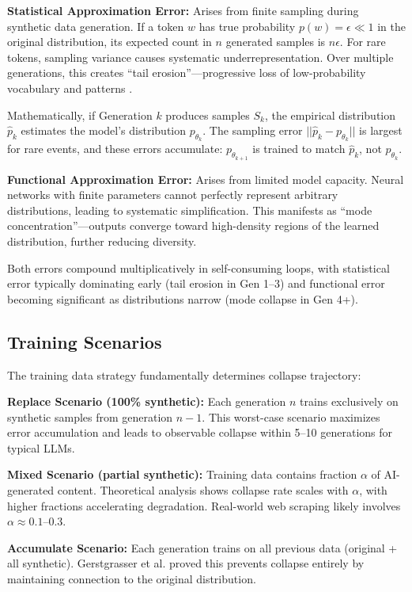 \documentclass[conference]{IEEEtran}
\begin{document}
\textbf{Statistical Approximation Error:} Arises from finite sampling during synthetic data generation. If a token $w$ has true probability $p(w) = \epsilon \ll 1$ in the original distribution, its expected count in $n$ generated samples is $n\epsilon$. For rare tokens, sampling variance causes systematic underrepresentation. Over multiple generations, this creates ``tail erosion''---progressive loss of low-probability vocabulary and patterns \cite{dohmatob2025strong, shumailov2024nature}.

Mathematically, if Generation $k$ produces samples $S_k$, the empirical distribution $\hat{p}_k$ estimates the model's distribution $p_{\theta_k}$. The sampling error $||\hat{p}_k - p_{\theta_k}||$ is largest for rare events, and these errors accumulate: $p_{\theta_{k+1}}$ is trained to match $\hat{p}_k$, not $p_{\theta_k}$.

\textbf{Functional Approximation Error:} Arises from limited model capacity. Neural networks with finite parameters cannot perfectly represent arbitrary distributions, leading to systematic simplification. This manifests as ``mode concentration''---outputs converge toward high-density regions of the learned distribution, further reducing diversity.

Both errors compound multiplicatively in self-consuming loops, with statistical error typically dominating early (tail erosion in Gen 1--3) and functional error becoming significant as distributions narrow (mode collapse in Gen 4+).

\subsection{Training Scenarios}

The training data strategy fundamentally determines collapse trajectory:

\textbf{Replace Scenario (100\% synthetic):} Each generation $n$ trains exclusively on synthetic samples from generation $n-1$. This worst-case scenario maximizes error accumulation and leads to observable collapse within 5--10 generations for typical LLMs.

\textbf{Mixed Scenario (partial synthetic):} Training data contains fraction $\alpha$ of AI-generated content. Theoretical analysis \cite{dohmatob2025strong} shows collapse rate scales with $\alpha$, with higher fractions accelerating degradation. Real-world web scraping likely involves $\alpha \approx 0.1$--$0.3$.

\textbf{Accumulate Scenario:} Each generation trains on all previous data (original + all synthetic). Gerstgrasser et al. \cite{gerstgrasser2024inevitable} proved this prevents collapse entirely by maintaining connection to the original distribution.
\end{document}
